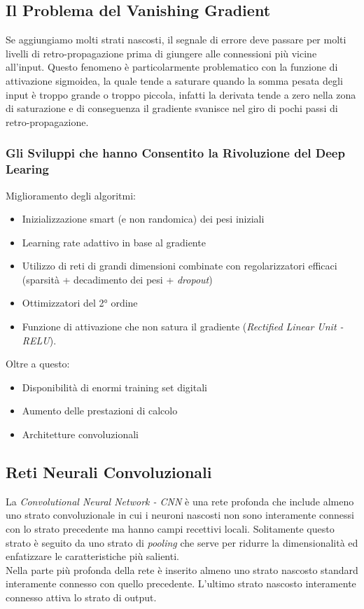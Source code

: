 \subsection{Il Problema del Vanishing Gradient}
Se aggiungiamo molti strati nascosti, il segnale di errore deve passare per molti livelli di retro-propagazione prima di giungere alle connessioni più vicine all'input. Questo fenomeno è particolarmente problematico con la funzione di attivazione sigmoidea, la quale tende a saturare quando la somma pesata degli input è troppo grande o troppo piccola, infatti la derivata tende a zero nella zona di saturazione e di conseguenza il gradiente svanisce nel giro di pochi passi di retro-propagazione.
\subsubsection{Gli Sviluppi che hanno Consentito la Rivoluzione del Deep Learing}
Miglioramento degli algoritmi:
\begin{itemize}
    \item Inizializzazione smart (e non randomica) dei pesi iniziali
    \item Learning rate adattivo in base al gradiente
    \item Utilizzo di reti di grandi dimensioni combinate con regolarizzatori efficaci (sparsità + decadimento dei pesi + \textit{dropout})
    \item Ottimizzatori del 2° ordine
    \item Funzione di attivazione che non satura il gradiente (\textit{Rectified Linear Unit - RELU}).
\end{itemize}

Oltre a questo:
\begin{itemize}
    \item Disponibilità di enormi training set digitali
    \item Aumento delle prestazioni di calcolo
    \item Architetture convoluzionali
\end{itemize}

\subsection{Reti Neurali Convoluzionali}
La \textit{Convolutional Neural Network - CNN} è una rete profonda che include almeno uno strato convoluzionale in cui i neuroni nascosti non sono interamente connessi con lo strato precedente ma hanno campi recettivi locali. Solitamente questo strato è seguito da uno strato di \textit{pooling} che serve per ridurre la dimensionalità ed enfatizzare le caratteristiche più salienti.\\
Nella parte più profonda della rete è inserito almeno uno strato nascosto standard interamente connesso con quello precedente. L'ultimo strato nascosto interamente connesso attiva lo strato di output.
